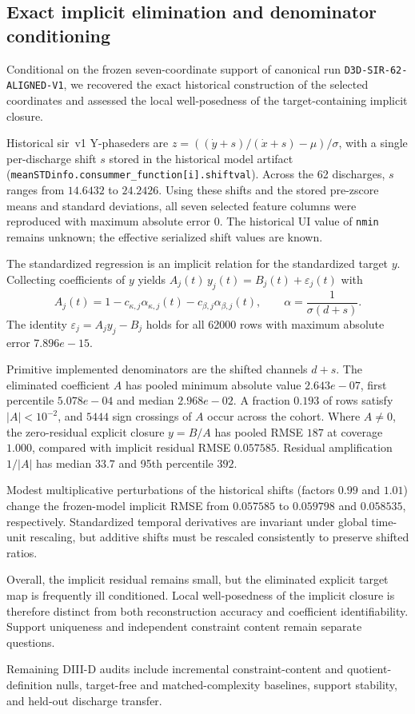 \subsection{Exact implicit elimination and denominator conditioning}
\label{supp:d3d-implicit-conditioning}

Conditional on the frozen seven-coordinate support of canonical run
\texttt{D3D-SIR-62-ALIGNED-V1}, we recovered the exact historical
construction of the selected coordinates and assessed the local well-posedness
of the target-containing implicit closure.

Historical sir~v1 Y-phaseders are
\(z=(({\dot y}+s)/({\dot x}+s)-\mu)/\sigma\), with a single per-discharge
shift \(s\) stored in the historical model artifact
(\texttt{meanSTDinfo.consummer\_function[i].shiftval}). Across the 62
discharges, \(s\) ranges from $14.6432$ to
$24.2426$. Using these shifts and the stored pre-zscore
means and standard deviations, all seven selected feature columns were
reproduced with maximum absolute error $0$. The historical UI value of
\texttt{nmin} remains unknown; the effective serialized shift values are
known.

The standardized regression is an implicit relation for the standardized
target \(y\). Collecting coefficients of \(y\) yields
\(A_j(t)\,y_j(t)=B_j(t)+\varepsilon_j(t)\) with
\[
A_j(t)=1-c_{\kappa,j}\alpha_{\kappa,j}(t)-c_{\beta,j}\alpha_{\beta,j}(t),
\qquad
\alpha=\frac{1}{\sigma(d+s)}.
\]
The identity \(\varepsilon_j=A_j y_j-B_j\) holds for all 62000 rows with
maximum absolute error $7.896e-15$.

Primitive implemented denominators are the shifted channels \(d+s\). The
eliminated coefficient \(A\) has pooled minimum absolute value
$2.643e-07$, first percentile $5.078e-04$ and
median $2.968e-02$. A fraction
$0.193$ of rows satisfy $|A|<10^{-2}$, and
$5444$ sign crossings of \(A\) occur across the cohort.
Where \(A\neq 0\), the zero-residual explicit closure \(y=B/A\) has pooled RMSE
$187$ at coverage $1.000$, compared with
implicit residual RMSE $0.057585$. Residual
amplification \(1/|A|\) has median $33.7$ and
95th percentile $392$.

Modest multiplicative perturbations of the historical shifts (factors $0.99$
and $1.01$) change the frozen-model implicit RMSE from $0.057585$ to
$0.059798$ and $0.058535$, respectively. Standardized temporal derivatives
are invariant under global time-unit rescaling, but additive shifts must be
rescaled consistently to preserve shifted ratios.

Overall, the implicit residual remains small, but the eliminated explicit
target map is frequently ill conditioned. Local well-posedness of the
implicit closure is therefore distinct from both reconstruction accuracy and
coefficient identifiability. Support uniqueness and independent constraint
content remain separate questions.

Remaining DIII-D audits include incremental constraint-content and
quotient-definition nulls, target-free and matched-complexity baselines,
support stability, and held-out discharge transfer.
